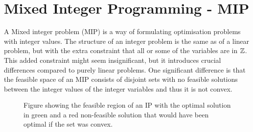\section{Mixed Integer Programming - MIP}
A Mixed integer problem (MIP) is a way of formulating optimisation problems with integer values. The structure of an integer problem is the same as of a linear problem, but with the extra constraint that all or some of the variables are in $\mathbb{Z}$. This added constraint might seem insignificant, but it introduces crucial differences compared to purely linear problems. One significant difference is that the feasible space of an MIP consists of disjoint sets with no feasible solutions between the integer values of the integer variables and thus it is not convex.
\begin{figure}[H]
\centering
{}
\caption{Figure showing the feasible region of an IP with the optimal solution in green and a red non-feasible solution that would have been optimal if the set was convex.}
\end{figure}
